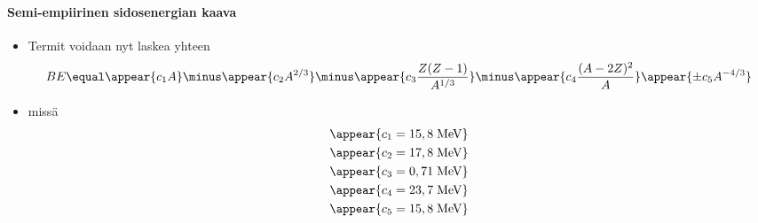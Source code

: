 \begin{frame}
\frametitle{\texorpdfstring{\culine[\sectiontitleulinecolor]{\sectiontitle}}{\sectiontitle} }
\framesubtitle{Semi-empiirinen sidosenergian kaava}%
\appear{}

\begin{itemize}
	\item Termit voidaan nyt laskea yhteen
	\[
B E \equal \appear{c_{1} A}  \minus \appear{c_{2} A^{2 / 3}}  \minus \appear{c_{3} \frac{Z(Z-1)}{A^{1 / 3}}}  \minus \appear{c_{4} \frac{(A-2 Z)^{2}}{A}} \appear{\pm c_{5} A^{-4 / 3}}
\]
\item[] missä 
$$
\begin{aligned}
&\appear{c_{1}=15,8 \mathrm{\;MeV}} \\
&\appear{c_{2}=17,8 \mathrm{\;MeV}} \\
&\appear{c_{3}=0,71 \mathrm{\;MeV}} \\
&\appear{c_{4}=23,7 \mathrm{\;MeV}} \\
&\appear{c_{5}=15,8 \mathrm{\;MeV}}
\end{aligned}
$$
\end{itemize}


\endofslide 
\end{frame}


